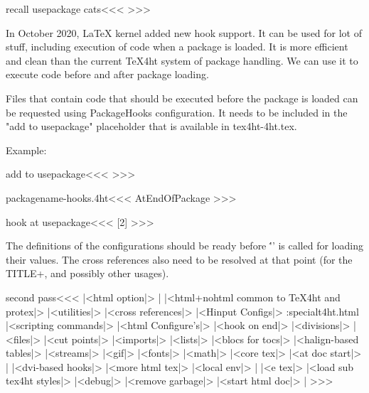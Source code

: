 \<recall usepackage cats\><<<
\TivhTcats
>>>

In October 2020, LaTeX kernel added new hook support. It can be used
for lot of stuff, including execution of code when a package is loaded.
It is more efficient and clean than the current TeX4ht system of package
handling. We can use it to execute code before and after package loading.

Files that contain code that should be executed before the package is loaded
can be requested using PackageHooks configuration. It needs to be included
in the "add to usepackage" placeholder that is available in tex4ht-4ht.tex.

Example:

\Verbatim
\<add to usepackage\><<<
>>>

\<packagename-hooks.4ht\><<<
\:AtEndOfPackage{
}
>>> 

\EndVerbatim

\<hook at usepackage\><<<
[2]{\expandafter\def\csname package:hooks:#1\endcsname{}}
\def\a:usepackage:lthooks#1#2{%
  \expandafter\ifcsname package:hooks:#1.#2\endcsname
  \csname package:hooks:#1.#2\endcsname
  \fi
}
>>>




The definitions of the configurations should be ready before
\''\Hinput' is called for loading their values.  The cross references
also need to be resolved at that point (for the TITLE+, and possibly
other usages).

\<second pass\><<<
|<html option|>                  |%
|<html+nohtml common to TeX4ht and protex|>
|<utilities|>
|<cross references|>
\ifHtml
   |<Hinput Configs|>
     \ht:special{t4ht.\:html} 
   |<scripting commands|>
   |<html Configure's|>   
   |<hook on end|>
\fi
|<divisions|>
|<files|>
|<cut points|>
|<imports|>
|<lists|>
|<blocs for tocs|>
\ifHtml
   |<halign-based tables|>
\fi
|<streams|>
|<gif|> 
|<fonts|>
|<math|>
|<core tex|>
|<at doc start|>  |%
\ifHtml
   |<dvi-based hooks|>
   |<more html tex|> 
\fi
|<local env|>                    |%
\ifx\beginL\@undefined \else
   \ifHtml 
      |<e tex|>
\fi\fi
|<load sub tex4ht styles|>
|<debug|>
|<remove garbage|>
\ifHtml |<start html doc|> \fi   |%
>>>




